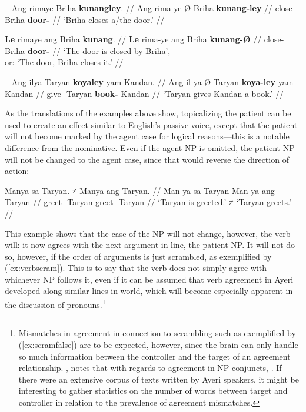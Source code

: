 \xe

\pex~
\a\begingl
	\gla Ang rimaye {} Briha \textbf{kunangley}. //
	\glb Ang rima-ye Ø Briha \textbf{kunang-ley} //
	\glc \AgtT{} close-\TsgF{} \Top{} Briha \textbf{door-\PargI{}} //
	\glft `Briha closes a/the door.' //
\endgl

\a\begingl
	\gla \textbf{Le} rimaye ang Briha \textbf{kunang}. //
	\glb \textbf{Le} rima-ye ang Briha \textbf{kunang-Ø} //
	\glc \textbf{\PatTI{}} close-\TsgF{} \Aarg{} Briha 
		\textbf{door-\Top{}} //
	\glft `The door is closed by Briha',\\
		or: `The door, Briha closes it.' //
\endgl

\xe

\ex~
\begingl
	\gla Ang ilya {} Taryan \textbf{koyaley} yam Kandan. //
	\glb Ang il-ya Ø Taryan \textbf{koya-ley} yam Kandan //
	\glc \AgtT{} give-\TsgM{} \Top{} Taryan \textbf{book-\PargI{}} \Dat{} 
		Kandan //
	\glft `Taryan gives Kandan a book.' //
\endgl

\xe

As the translations of the examples above show, topicalizing the patient can be 
used to create an effect similar to English's passive voice, except that the 
patient will not become marked by the agent case for logical reasons---this is 
a notable difference from the nominative. Even if the agent NP is omitted, the 
patient NP will not be changed to the agent case, since that would reverse the 
direction of action:

\ex\begingl
	\gla Manya sa Taryan. ≠ Manya ang Taryan. //
	\glb Man-ya sa Taryan {} Man-ya ang Taryan //
	\glc greet-\TsgM{} \Parg{} Taryan {} greet-\TsgM{} \Aarg{} Taryan //
	\glft `Taryan is greeted.' ≠ `Taryan greets.' //
\endgl\xe

This example shows that the case of the NP will not change, however, the 
verb will: it now agrees with the next argument in line, the patient NP. It will 
not do so, however, if the order of arguments is just scrambled, as 
exemplified by (\ref{ex:verbscram}). This is to say that the verb does not 
simply agree with whichever NP follows it, even if it can be assumed that verb 
agreement in Ayeri developed along similar lines in-world, which will become 
especially apparent in the discussion of pronouns.\footnote{Mismatches in 
agreement in connection to scrambling such as exemplified by 
(\ref{ex:scramfalse}) are to be expected, however, since the brain can only 
handle so much information between the controller and the target of an 
agreement relationship. \citet{corbett2006}, notes that with regards to 
agreement in NP conjuncts, . If there were an extensive corpus of 
texts written by Ayeri speakers, it might be interesting to gather statistics 
on the number of words between target and controller in relation to the 
prevalence of agreement mismatches.}

